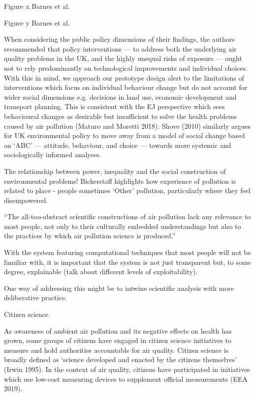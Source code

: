 \documentclass[10pt,english, openany]{book}
\begin{document}
{ 
Figure x Barnes et al. 
 

Figure y Barnes et al. 


When considering the public policy dimensions of their findings, the authors recommended that policy interventions — to address both the underlying air quality problems in the UK, and the highly unequal risks of exposure — ought not to rely predominantly on technological improvements and individual choices. With this in mind, we approach our prototype design alert to the limitations of interventions which focus on individual behaviour change but do not account for wider social dimensions e.g. decisions in land use, economic development and transport planning. This is consistent with the EJ perspective which sees behavioural changes as desirable but insufficient to solve the health problems caused by air pollution (Maturo and Moretti 2018). Shove (2010) similarly argues for UK environmental policy to move away from a model of social change based on ‘ABC’ — attitude, behaviour, and choice — towards more systemic and sociologically informed analyses. 

The relationship between power, inequality and the social construction of environmental problems! Bickerstaff highlights how experience of pollution is related to place - people sometimes ‘Other’ pollution, particularly where they feel disempowered.


“The all-too-abstract scientific constructions of air pollution lack any relevance to most people, not only to their culturally embedded understandings but also to the practices by which air pollution science is produced.”

With the system featuring computational techniques that most people will not be familiar with, it is important that the system is not just transparent but, to some degree, explainable (talk about different levels of exploitability). 

 One way of addressing this might be to intwine scientific analysis with more deliberative practice. 

Citizen science 

As awareness of ambient air pollution and its negative effects on health has grown, some groups of citizens have engaged in citizen science initiatives to measure and hold authorities accountable for air quality. Citizen science is broadly defined as ‘science developed and enacted by the citizens themselves’ (Irwin 1995). In the context of air quality, citizens have participated in initiatives which use low-cost measuring devices to supplement official measurements (EEA 2019). 


}
\end{document}
